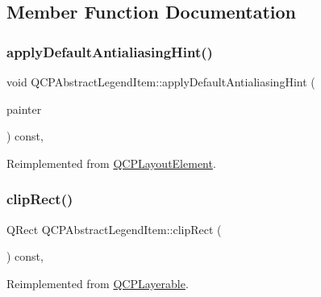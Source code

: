 \subsection{Member Function Documentation}
\mbox{\label{class_q_c_p_abstract_legend_item_a6bfbcb9ace779f4f6fe22241c32a67c9}} 
\subsubsection{\texorpdfstring{applyDefaultAntialiasingHint()}{applyDefaultAntialiasingHint()}}
{\footnotesize\ttfamily void Q\+C\+P\+Abstract\+Legend\+Item\+::apply\+Default\+Antialiasing\+Hint (\begin{DoxyParamCaption}\item[{\mbox{\hyperlink{class_q_c_p_painter}{Q\+C\+P\+Painter}} $\ast$}]{painter }\end{DoxyParamCaption}) const\hspace{0.3cm}{\ttfamily [protected]}, {\ttfamily [virtual]}}



Reimplemented from \mbox{\hyperlink{class_q_c_p_layout_element_a0a8f18141bcf46cf40ad4c13324ff346}{Q\+C\+P\+Layout\+Element}}.

\mbox{\label{class_q_c_p_abstract_legend_item_a806fa4d0104bdfc141aa8a36fcc9d51c}} 
\subsubsection{\texorpdfstring{clipRect()}{clipRect()}}
{\footnotesize\ttfamily Q\+Rect Q\+C\+P\+Abstract\+Legend\+Item\+::clip\+Rect (\begin{DoxyParamCaption}{ }\end{DoxyParamCaption}) const\hspace{0.3cm}{\ttfamily [protected]}, {\ttfamily [virtual]}}



Reimplemented from \mbox{\hyperlink{class_q_c_p_layerable_acbcfc9ecc75433747b1978a77b1864b3}{Q\+C\+P\+Layerable}}.

